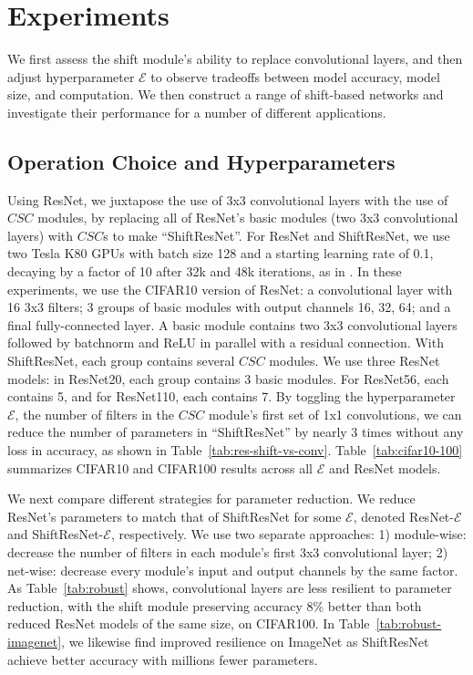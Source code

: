 \documentclass[10pt,twocolumn,letterpaper]{article}
\begin{document}
\section{Experiments}

We first assess the shift module's ability to replace convolutional layers, and then adjust hyperparameter $\mathcal{E}$ to observe tradeoffs between model accuracy, model size, and computation. 
We then construct a range of shift-based networks and investigate their performance for a number of different applications.

\subsection{Operation Choice and Hyperparameters}

Using ResNet, we juxtapose the use of 3x3 convolutional layers with the use of $CSC$ modules, by replacing all of ResNet's basic modules (two 3x3 convolutional layers) with $CSC$s to make ``ShiftResNet''. For ResNet and ShiftResNet, we use two Tesla K80 GPUs with batch size 128 and a starting learning rate of 0.1, decaying by a factor of 10 after 32k and 48k iterations, as in \cite{ResNet}. In these experiments, we use the CIFAR10 version of ResNet: a convolutional layer with 16 3x3 filters; 3 groups of basic modules with output channels 16, 32, 64; and a final fully-connected layer. A basic module contains two 3x3 convolutional layers followed by batchnorm and ReLU in parallel with a residual connection. With ShiftResNet, each group contains several $CSC$ modules. We use three ResNet models: in ResNet20, each group contains 3 basic modules. For ResNet56, each contains 5, and for ResNet110, each contains 7. By toggling the hyperparameter $\mathcal{E}$, the number of filters in the $CSC$ module's first set of 1x1 convolutions, we can reduce the number of parameters in ``ShiftResNet'' by nearly 3 times without any loss in accuracy, as shown in Table~\ref{tab:res-shift-vs-conv}. Table~\ref{tab:cifar10-100} summarizes CIFAR10 and CIFAR100 results across all $\mathcal{E}$ and ResNet models.

We next compare different strategies for parameter reduction. We reduce ResNet's parameters to match that of ShiftResNet for some $\mathcal{E}$, denoted ResNet-$\mathcal{E}$ and ShiftResNet-$\mathcal{E}$, respectively. We use two separate approaches: 1) module-wise: decrease the number of filters in each module's first 3x3 convolutional layer; 2) net-wise: decrease every module's input and output channels by the same factor. As Table~\ref{tab:robust} shows, convolutional layers are less resilient to parameter reduction, with the shift module preserving accuracy 8\% better than both reduced ResNet models of the same size, on CIFAR100. In Table~\ref{tab:robust-imagenet}, we likewise find improved resilience on ImageNet as ShiftResNet achieve better accuracy with millions fewer parameters.
\end{document}
